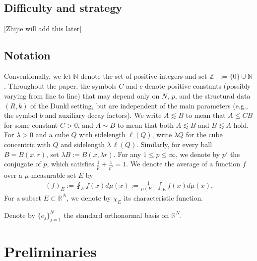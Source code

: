 \documentclass[12pt]{amsart}
\begin{document}
\subsection{Difficulty and strategy}
{\color{red}[Zhijie will add this later]}
\subsection{Notation}
Conventionally, we let $\mathbb{N}$ denote the set of positive integers and set $\mathbb{Z}_+ := \{0\} \cup \mathbb{N}$. Throughout the paper, the symbols $C$ and $c$ denote positive constants (possibly varying from line to line) that may depend only on $N$, $p$, and the structural data $(R,k)$ of the Dunkl setting, but are independent of the main parameters (e.g., the symbol $b$ and auxiliary decay factors).
 We write $A \lesssim B$ to mean that $A \leq C B$ for some constant $C > 0$, and $A \sim B$ to mean that both $A \lesssim B$ and $B \lesssim A$ hold.
For \(\lambda>0\) and a cube \(Q\) with sidelength \(\ell(Q)\), write \(\lambda Q\) for the cube concentric with \(Q\) and sidelength \(\lambda\,\ell(Q)\). Similarly, for every ball \(B=B(x,r)\), set \(\lambda B:=B(x,\lambda r)\). For any $1\leq p\leq\infty$, we denote by $p'$ the conjugate of $p$, which satisfies $\frac{1}{p}+\frac{1}{p'}=1$. We denote the average of a function $f$ over a $\mu$-measurable set $E$ by
\begin{align}\label{defaverage}
(f)_E:=\fint_{E}f(x)d\mu(x):=\frac{1}{\mu(E)}\int_{E}f(x)d\mu(x).
\end{align}
For a subset $E \subset \mathbb{R}^{N}$, we denote by $\chi_E$ its characteristic function.

Denote by $\{e_j\}_{j=1}^N$ the standard orthonormal basis on $\mathbb{R}^N$.


\section{Preliminaries}
\setcounter{equation}{0}
\end{document}
